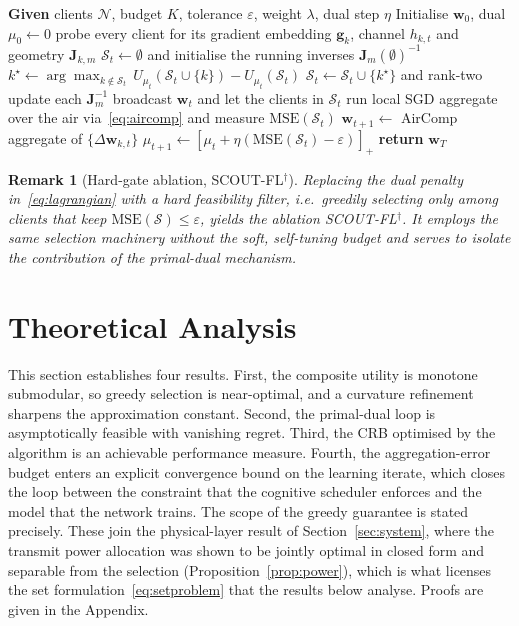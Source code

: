 \documentclass[lettersize,journal]{IEEEtran}
\newtheorem{remark}{Remark}
\newcommand{\bw}{\bm{w}}
\newcommand{\bJ}{\bm{J}}
\newcommand{\bg}{\bm{g}}
\newcommand{\calS}{\mathcal{S}}
\newcommand{\calN}{\mathcal{N}}
\newcommand{\scout}{SCOUT-FL}
\begin{document}
\begin{algorithm}[t]
\caption{\scout{}, sensing-aware primal-dual selection}
\label{alg:scout}
\begin{algorithmic}[1]
\STATE \textbf{Given} clients $\calN$, budget $K$, tolerance $\varepsilon$, weight $\lambda$, dual step $\eta$
\STATE Initialise $\bw_0$, dual $\mu_0\gets 0$
  \STATE probe every client for its gradient embedding $\bg_{k}$, channel $h_{k,t}$ and geometry $\bJ_{k,m}$
  \STATE $\calS_t\gets\emptyset$ and initialise the running inverses $\bJ_m(\emptyset)^{-1}$
     \STATE $k^\star\gets\arg\max_{k\notin\calS_t}\, U_{\mu_t}(\calS_t\cup\{k\})-U_{\mu_t}(\calS_t)$
     \STATE $\calS_t\gets\calS_t\cup\{k^\star\}$ and rank-two update each $\bJ_m^{-1}$
  \ENDFOR
  \STATE broadcast $\bw_t$ and let the clients in $\calS_t$ run local SGD
  \STATE aggregate over the air via~\eqref{eq:aircomp} and measure $\mathrm{MSE}(\calS_t)$
  \STATE $\bw_{t+1}\gets$ AirComp aggregate of $\{\Delta\bw_{k,t}\}$
  \STATE $\mu_{t+1}\gets[\mu_t+\eta(\mathrm{MSE}(\calS_t)-\varepsilon)]_+$
\ENDFOR
\STATE \textbf{return} $\bw_T$
\end{algorithmic}
\end{algorithm}

\begin{remark}[Hard-gate ablation, \scout{}$^{\dagger}$]
Replacing the dual penalty in~\eqref{eq:lagrangian} with a hard feasibility filter, i.e.\ greedily selecting only among clients that keep $\mathrm{MSE}(\calS)\le\varepsilon$, yields the ablation \scout{}$^{\dagger}$. It employs the same selection machinery without the soft, self-tuning budget and serves to isolate the contribution of the primal-dual mechanism.
\end{remark}

\section{Theoretical Analysis}\label{sec:theory}
This section establishes four results. First, the composite utility is monotone submodular, so greedy selection is near-optimal, and a curvature refinement sharpens the approximation constant. Second, the primal-dual loop is asymptotically feasible with vanishing regret. Third, the CRB optimised by the algorithm is an achievable performance measure. Fourth, the aggregation-error budget enters an explicit convergence bound on the learning iterate, which closes the loop between the constraint that the cognitive scheduler enforces and the model that the network trains. The scope of the greedy guarantee is stated precisely. These join the physical-layer result of Section~\ref{sec:system}, where the transmit power allocation was shown to be jointly optimal in closed form and separable from the selection (Proposition~\ref{prop:power}), which is what licenses the set formulation~\eqref{eq:setproblem} that the results below analyse. Proofs are given in the Appendix.
\end{document}
